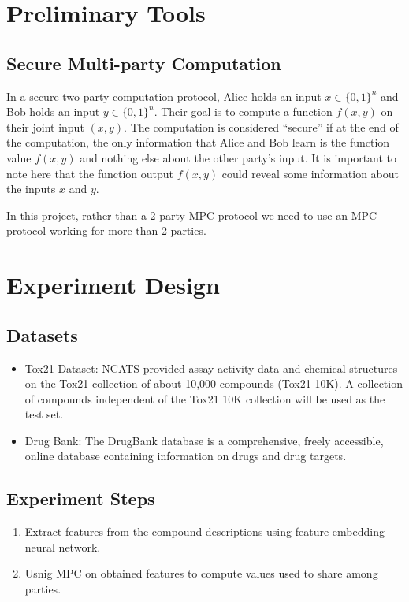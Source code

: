 \documentclass[]{article}
\begin{document}
\section{Preliminary Tools}
\subsection{Secure Multi-party Computation}
In a secure two-party computation protocol, Alice holds an input $x\in\{0,1\}^n$ and
Bob holds an input $y\in\{0,1\}^n$. Their goal is to compute a function $f(x, y)$ on their joint input $(x, y)$. The computation is considered “secure” if at the end of the computation,
the only information that Alice and Bob learn is the function value $f(x, y)$ and nothing
else about the other party’s input. It is important to note here that the function output
$f(x, y)$ could reveal some information about the inputs $x$ and $y$. 

In this project, rather than a 2-party MPC protocol we need to use an MPC protocol working for more than 2 parties.

\section{Experiment Design}
\subsection{Datasets}
\begin{itemize}
	\item Tox21 Dataset: NCATS provided assay activity data and chemical structures on the Tox21 collection of about 10,000 compounds (Tox21 10K). A collection of compounds independent of the Tox21 10K collection will be used as the test set.
	\item Drug Bank: The DrugBank database is a comprehensive, freely accessible, online database containing information on drugs and drug targets.
\end{itemize}
\subsection{Experiment Steps}
\begin{enumerate}
	\item Extract features from the compound descriptions using feature embedding neural network.
	\item Usnig MPC on obtained features to compute values used to share among parties.
\end{enumerate}



\end{document}
